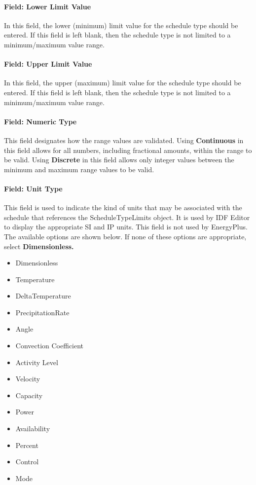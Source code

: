 \paragraph{Field: Lower Limit Value}\label{field-lower-limit-value}

In this field, the lower (minimum) limit value for the schedule type should be entered. If this field is left blank, then the schedule type is not limited to a minimum/maximum value range.

\paragraph{Field: Upper Limit Value}\label{field-upper-limit-value}

In this field, the upper (maximum) limit value for the schedule type should be entered. If this field is left blank, then the schedule type is not limited to a minimum/maximum value range.

\paragraph{Field: Numeric Type}\label{field-numeric-type}

This field designates how the range values are validated. Using \textbf{Continuous} in this field allows for all numbers, including fractional amounts, within the range to be valid. Using \textbf{Discrete} in this field allows only integer values between the minimum and maximum range values to be valid.

\paragraph{Field: Unit Type}\label{field-unit-type}

This field is used to indicate the kind of units that may be associated with the schedule that references the ScheduleTypeLimits object. It is used by IDF Editor to display the appropriate SI and IP units. This field is not used by EnergyPlus. The available options are shown below. If none of these options are appropriate, select \textbf{Dimensionless.}

\begin{itemize}
\item
  Dimensionless
\item
  Temperature
\item
  DeltaTemperature
\item
  PrecipitationRate
\item
  Angle
\item
  Convection Coefficient
\item
  Activity Level
\item
  Velocity
\item
  Capacity
\item
  Power
\item
  Availability
\item
  Percent
\item
  Control
\item
  Mode
\end{itemize}


